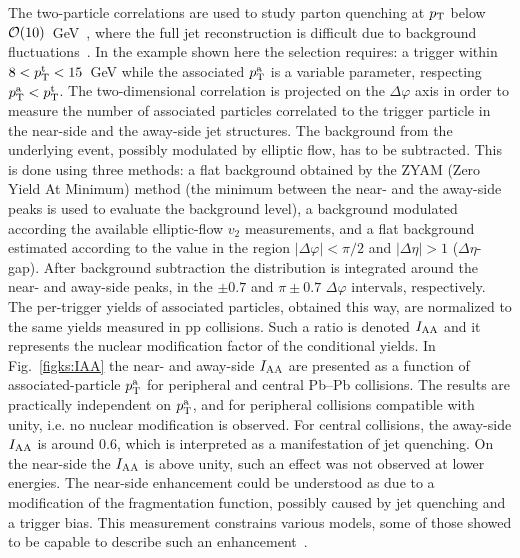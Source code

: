 The two-particle correlations are used to study parton quenching at $p_{\rm T}$ below ${\cal O}(10)$~GeV~\cite{Aamodt:2011vg}, where the full jet reconstruction is difficult due to background fluctuations~\cite{Abelev:2012ej}. In the example shown here the selection requires: a trigger within $8 < p_{\rm T}^{\rm t} < 15$~GeV while the associated $p_{\rm T}^{\rm a}$ is a variable parameter, respecting $p_{\rm T}^{\rm a} <p_{\rm T}^{\rm t}$. The two-dimensional correlation is projected on the $\Delta\varphi$ axis in order to measure the number of associated particles correlated to the trigger particle in the near-side and the away-side jet structures. The background from the underlying event, possibly modulated by elliptic flow, has to be subtracted. This is done using three methods: a flat background obtained by the ZYAM (Zero Yield At Minimum) method (the minimum between the near- and the away-side peaks is used to evaluate the background level), a background modulated according the available elliptic-flow $v_2$ measurements, and a flat background estimated according to the value in the region $|\Delta\varphi| < \pi/2$ and $|\Delta\eta| > 1$  ($\Delta\eta$-gap). After background subtraction the distribution is integrated around the near- and away-side peaks, in the $\pm 0.7$ and $\pi \pm 0.7$ $\Delta\varphi$ intervals, respectively. The per-trigger yields of associated particles, obtained this way, are normalized to the same yields measured in pp collisions. Such a ratio is denoted $I_{\rm AA}$ and it represents the nuclear modification factor of the conditional yields. In Fig.~\ref{figks:IAA} the near- and away-side $I_{\rm AA}$ are presented as a function of associated-particle $p_{\rm T}^{\rm a}$ for peripheral and central Pb--Pb collisions. The results are practically independent on $p_{\rm T}^{\rm a}$, and for peripheral collisions compatible with unity, i.e. no nuclear modification is observed. For central collisions, the away-side $I_{\rm AA}$ is around 0.6, which is interpreted as a manifestation of jet quenching. On the near-side the $I_{\rm AA}$ is above unity, such an effect was not observed at lower energies. The near-side enhancement could be understood as due to a modification of the fragmentation function, possibly caused by jet quenching and a trigger bias. This measurement constrains various models, some of those showed to be capable to describe such an enhancement~\cite{Renk:2011wp}.

